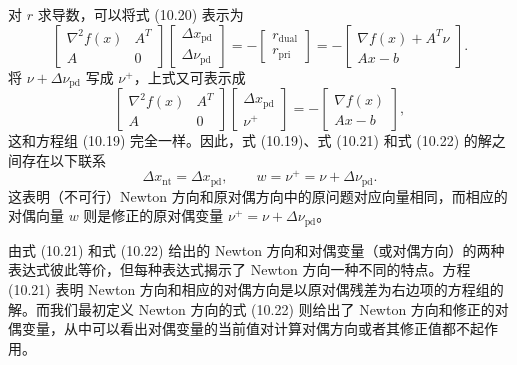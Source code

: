 \documentclass[UTF8,12pt,a4paper,fontset=fandol]{ctexart}
\begin{document}
对 $r$ 求导数，可以将式 (10.20) 表示为
\begin{equation}
\begin{bmatrix}
\nabla^2 f(x) & A^T\\
A & 0
\end{bmatrix}
\begin{bmatrix}
\Delta x_{\mathrm{pd}}\\
\Delta\nu_{\mathrm{pd}}
\end{bmatrix}
=-
\begin{bmatrix}
r_{\mathrm{dual}}\\
r_{\mathrm{pri}}
\end{bmatrix}
=-
\begin{bmatrix}
\nabla f(x)+A^T\nu\\
Ax-b
\end{bmatrix}.
\tag{10.21}
\end{equation}
将 $\nu+\Delta\nu_{\mathrm{pd}}$ 写成 $\nu^+$，上式又可表示成
\begin{equation}
\begin{bmatrix}
\nabla^2 f(x) & A^T\\
A & 0
\end{bmatrix}
\begin{bmatrix}
\Delta x_{\mathrm{pd}}\\
\nu^+
\end{bmatrix}
=-
\begin{bmatrix}
\nabla f(x)\\
Ax-b
\end{bmatrix},
\tag{10.22}
\end{equation}
这和方程组 (10.19) 完全一样。因此，式 (10.19)、式 (10.21) 和式 (10.22) 的解之间存在以下联系
\[
\Delta x_{\mathrm{nt}}=\Delta x_{\mathrm{pd}},\qquad
w=\nu^+=\nu+\Delta\nu_{\mathrm{pd}}.
\]
这表明（不可行）Newton 方向和原对偶方向中的原问题对应向量相同，而相应的对偶向量 $w$ 则是修正的原对偶变量 $\nu^+=\nu+\Delta\nu_{\mathrm{pd}}$。

由式 (10.21) 和式 (10.22) 给出的 Newton 方向和对偶变量（或对偶方向）的两种表达式彼此等价，但每种表达式揭示了 Newton 方向一种不同的特点。方程 (10.21) 表明 Newton 方向和相应的对偶方向是以原对偶残差为右边项的方程组的解。而我们最初定义 Newton 方向的式 (10.22) 则给出了 Newton 方向和修正的对偶变量，从中可以看出对偶变量的当前值对计算对偶方向或者其修正值都不起作用。
\end{document}
